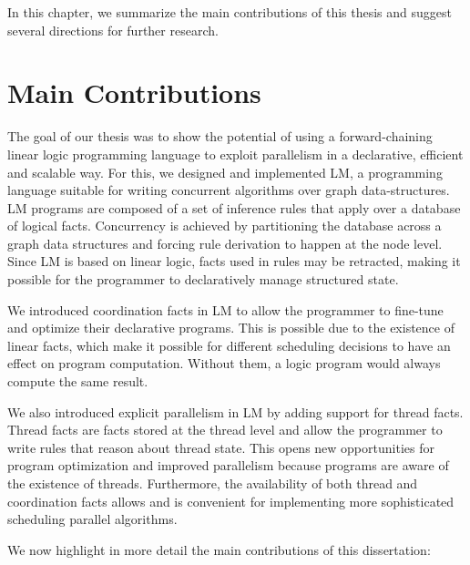 
In this chapter, we summarize the main contributions of this thesis and suggest
several directions for further research.

\section{Main Contributions}

The goal of our thesis was to show the potential of using a forward-chaining
linear logic programming language to exploit parallelism in a declarative,
efficient and scalable way. For this, we designed and implemented LM, a
programming language suitable for writing concurrent algorithms over graph
data-structures. LM programs are composed of a set of inference rules that apply
over a database of logical facts. Concurrency is achieved by partitioning the
database across a graph data structures and forcing rule derivation to happen at
the node level. Since LM is based on linear logic, facts used in rules may be
retracted, making it possible for the programmer to declaratively manage
structured state.

We introduced coordination facts in LM to allow the programmer to fine-tune and
optimize their declarative programs. This is possible due to the existence of
linear facts, which make it possible for different scheduling decisions to have
an effect on program computation. Without them, a logic program would always
compute the same result.

We also introduced explicit parallelism in LM by adding support for thread
facts. Thread facts are facts stored at the thread level and allow the
programmer to write rules that reason about thread state. This opens new
opportunities for program optimization and improved parallelism because programs
are aware of the existence of threads. Furthermore, the availability of both
thread and coordination facts allows and is convenient for implementing more
sophisticated scheduling parallel algorithms.

We now highlight in more detail the main contributions of this dissertation:

